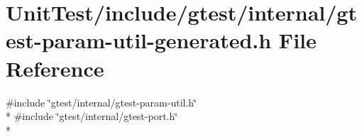 \hypertarget{gtest-param-util-generated_8h}{\section{Unit\+Test/include/gtest/internal/gtest-\/param-\/util-\/generated.h File Reference}
\label{gtest-param-util-generated_8h}
}
{\ttfamily \#include \char`\"{}gtest/internal/gtest-\/param-\/util.\+h\char`\"{}}\\*
{\ttfamily \#include \char`\"{}gtest/internal/gtest-\/port.\+h\char`\"{}}\\*
